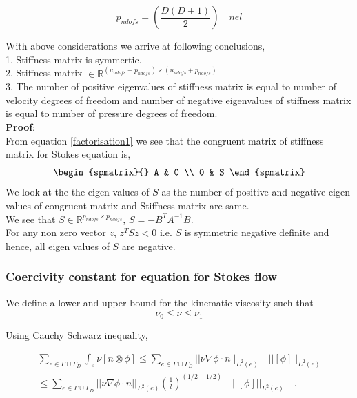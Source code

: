 \documentclass[a4paper]{book}
\begin{document}
\begin{equation} \label{pndofs}
p_{ndofs} = \left(\frac{D(D+1)}{2}\right) \quad nel
\end{equation}

With above considerations we arrive at following conclusions, \\

1. Stiffness matrix is symmertic. \\
2. Stiffness matrix $ \in \mathbb{R}^{(u_{ndofs} + p_{ndofs}) \times (u_{ndofs} + p_{ndofs})}$\\
3. The number of positive eigenvalues of stiffness matrix is equal to number of velocity degrees of freedom and number of negative eigenvalues of stiffness matrix is equal to number of pressure degrees of freedom.\\
\textbf{Proof}:\\
From equation \eqref{factorisation1} we see that the congruent matrix of stiffness matrix for Stokes equation is,
\begin{equation}
\begin{spmatrix}{}
    A & 0 \\
    0 & S
\end{spmatrix}
\end{equation}
We look at the the eigen values of $S$ as the number of positive and negative eigen values of congruent matrix and Stiffness matrix are same.\\
We see that $S \in \mathbb{R}^{p_{ndofs} \times p_{ndofs}}$, $S = - B^T A^{-1} B$.\\ 
For any non zero vector $z$, $z^T S z < 0$ i.e. $S$ is symmetric negative definite and hence, all eigen values of $S$ are negative.

\subsubsection{Coercivity constant for equation for Stokes flow} \label{basics}

We define a lower and upper bound for the kinematic viscosity such that \\
\begin{equation}
\nu_0 \leq \nu \leq \nu_1
\end{equation}

Using Cauchy Schwarz inequality, 

\begin{equation}
\begin{split}
\sum_{e \in \Gamma \cup \Gamma_D} \int_e {\nu}[n \otimes \phi] \leq \sum_{e \in \Gamma \cup \Gamma_D} ||\nu \nabla \phi \cdot n||_{L^2(e)} \quad ||[\phi]||_{L^2(e)} \\ \leq \sum_{e \in \Gamma \cup \Gamma_D} ||\nu \nabla \phi \cdot n||_{L^2(e)} (\frac{1}{l})^{(1/2-1/2)} \quad ||[\phi]||_{L^2(e)} \quad \textrm{.}
\end{split}
\end{equation}
\end{document}
